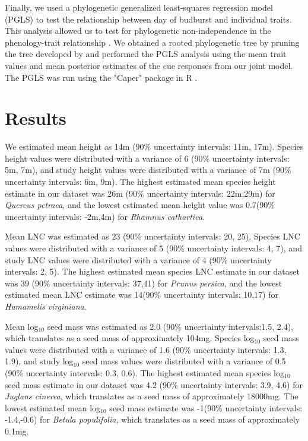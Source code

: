 \documentclass{article}\usepackage[]{graphicx}\usepackage[]{color}
\begin{document}

Finally, we used a phylogenetic generalized least-squares regression model (PGLS) to test the relationship between day of budburst and individual traits. This analysis allowed us to test for phylogenetic non-independence in the phenology-trait relationship \citep{Freckleton2002}. We obtained a rooted phylogenetic tree by pruning the tree developed by \citep{Smith2018} and performed the PGLS analysis using the mean trait values and mean posterior estimates of the cue responses from our joint model. The PGLS was run using the "Caper" package in R \citep{Orne2013}. \\

\section{Results}

We estimated mean height as 14m (90\% uncertainty intervals: 11m, 17m). Species height values were distributed with a variance of 6 (90\% uncertainty intervals: 5m, 7m), and study height values were distributed with a variance of 7m (90\% uncertainty intervals: 6m, 9m). The highest estimated mean species height estimate in our dataset was 26m (90\% uncertainty intervals: 22m,29m) for \textit{Quercus petraea}, and the lowest estimated mean height value was 0.7(90\% uncertainty intervals: -2m,4m) for \textit{Rhamnus cathartica}. 

Mean LNC was estimated as 23 (90\% uncertainty intervals: 20, 25). Species LNC values were distributed with a variance of 5 (90\% uncertainty intervals: 4, 7), and study LNC values were distributed with a variance of 4 (90\% uncertainty intervals: 2, 5). The highest estimated mean species LNC estimate in our dataset was 39 (90\% uncertainty intervals: 37,41) for \textit{Prunus persica}, and the lowest estimated mean LNC estimate was 14(90\% uncertainty intervals: 10,17) for \textit{Hamamelis virginiana}.

Mean log$_{10}$ seed mass was estimated as 2.0 (90\% uncertainty intervals:1.5, 2.4), which translates as a seed mass of approximately 104mg. Species log$_{10}$ seed mass values were distributed with a variance of 1.6 (90\% uncertainty intervals: 1.3, 1.9), and study log$_{10}$ seed mass values were distributed with a variance of 0.5 (90\% uncertainty intervals: 0.3, 0.6). The highest estimated mean species log$_{10}$ seed mass estimate in our dataset was 4.2 (90\% uncertainty intervals: 3.9, 4.6) for \textit{Juglans cinerea}, which translates as a seed mass of approximately 18000mg. The lowest estimated mean log$_{10}$ seed mass estimate was -1(90\% uncertainty intervals: -1.4,-0.6) for \textit{Betula populifolia}, which translates as a seed mass of approximately 0.1mg.
\end{document}
